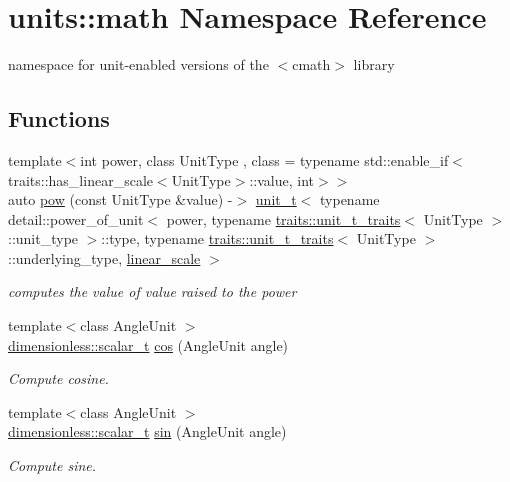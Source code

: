 \hypertarget{namespaceunits_1_1math}{}\section{units\+:\+:math Namespace Reference}
\label{namespaceunits_1_1math}


namespace for unit-\/enabled versions of the {\ttfamily $<$cmath$>$} library  


\subsection*{Functions}
\begin{DoxyCompactItemize}
\item 
{\footnotesize template$<$int power, class Unit\+Type , class  = typename std\+::enable\+\_\+if$<$traits\+::has\+\_\+linear\+\_\+scale$<$\+Unit\+Type$>$\+::value, int$>$$>$ }\\auto \hyperlink{namespaceunits_1_1math_adf689b7864a5c78a00628574cc8dca6b}{pow} (const Unit\+Type \&value) -\/$>$ \hyperlink{classunits_1_1unit__t}{unit\+\_\+t}$<$ typename detail\+::power\+\_\+of\+\_\+unit$<$ power, typename \hyperlink{structunits_1_1traits_1_1unit__t__traits}{traits\+::unit\+\_\+t\+\_\+traits}$<$ Unit\+Type $>$\+::unit\+\_\+type $>$\+::type, typename \hyperlink{structunits_1_1traits_1_1unit__t__traits}{traits\+::unit\+\_\+t\+\_\+traits}$<$ Unit\+Type $>$\+::underlying\+\_\+type, \hyperlink{structunits_1_1linear__scale}{linear\+\_\+scale} $>$
\begin{DoxyCompactList}\small\item\em computes the value of {\itshape value} raised to the {\itshape power} \end{DoxyCompactList}\item 
{\footnotesize template$<$class Angle\+Unit $>$ }\\\hyperlink{classunits_1_1unit__t}{dimensionless\+::scalar\+\_\+t} \hyperlink{group___unit_math_gaef41c97ac5e4160efc18887964be0b28}{cos} (Angle\+Unit angle)
\begin{DoxyCompactList}\small\item\em Compute cosine. \end{DoxyCompactList}\item 
{\footnotesize template$<$class Angle\+Unit $>$ }\\\hyperlink{classunits_1_1unit__t}{dimensionless\+::scalar\+\_\+t} \hyperlink{group___unit_math_ga3b19a88fe39801d545a9bd20fbd41001}{sin} (Angle\+Unit angle)
\begin{DoxyCompactList}\small\item\em Compute sine. \end{DoxyCompactList}\item 

\end{DoxyCompactItemize}
